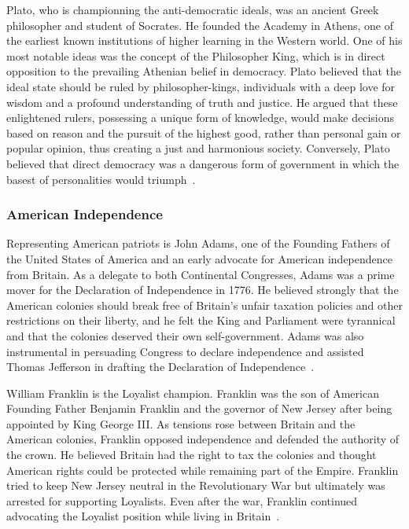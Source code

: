 \documentclass[jair,twoside,11pt,theapa]{article}
\begin{document}
Plato, who is championning the anti-democratic ideals, was an ancient Greek philosopher and student of Socrates. He founded the Academy in Athens, one of the earliest known institutions of higher learning in the Western world. One of his most notable ideas was the concept of the Philosopher King, which is in direct opposition to the prevailing Athenian belief in democracy.  Plato believed that the ideal state should be ruled by philosopher-kings, individuals with a deep love for wisdom and a profound understanding of truth and justice. He argued that these enlightened rulers, possessing a unique form of knowledge, would make decisions based on reason and the pursuit of the highest good, rather than personal gain or popular opinion, thus creating a just and harmonious society.  Conversely, Plato believed that direct democracy was a dangerous form of government in which the basest of personalities would triumph~.

\subsubsection{American Independence}
Representing American patriots is John Adams, one of the Founding Fathers of the United States of America and an early advocate for American independence from Britain.  As a delegate to both Continental Congresses, Adams was a prime mover for the Declaration of Independence in 1776. He believed strongly that the American colonies should break free of Britain's unfair taxation policies and other restrictions on their liberty, and he felt the King and Parliament were tyrannical and that the colonies deserved their own self-government.  Adams was also instrumental in persuading Congress to declare independence and assisted Thomas Jefferson in drafting the Declaration of Independence~.

William Franklin is the Loyalist champion.  Franklin was the son of American Founding Father Benjamin Franklin and the governor of New Jersey after being appointed by King George III.  As tensions rose between Britain and the American colonies, Franklin opposed independence and defended the authority of the crown.  He believed Britain had the right to tax the colonies and thought American rights could be protected while remaining part of the Empire. Franklin tried to keep New Jersey neutral in the Revolutionary War but ultimately was arrested for supporting Loyalists.  Even after the war, Franklin continued advocating the Loyalist position while living in Britain~.
\end{document}
